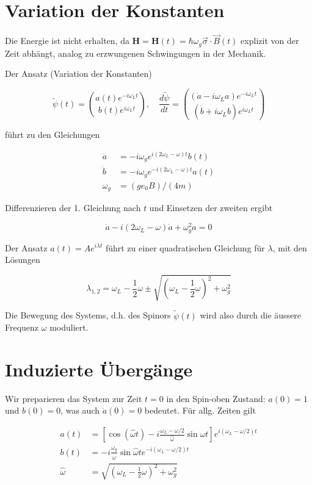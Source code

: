 \documentclass[10pt, letterpaper]{article}
\begin{document}
\section*{Variation der Konstanten}
Die Energie ist nicht erhalten, da $\mathbf{H}=\mathbf{H}(t)=\hbar \omega_{g} \vec{\sigma} \cdot \vec{B}(t)$ explizit von der Zeit abhängt, analog zu erzwungenen Schwingungen in der Mechanik.

Der Ansatz (Variation der Konstanten)

$$
\tilde{\psi}(t)=\binom{a(t) e^{-i \omega_{L} t}}{b(t) e^{i \omega_{L} t}}, \quad \frac{d \tilde{\psi}}{d t}=\binom{\left(\dot{a}-i \omega_{L} a\right) e^{-i \omega_{L} t}}{\left(\dot{b}+i \omega_{L} b\right) e^{i \omega_{L} t}}
$$

führt zu den Gleichungen

$$
\begin{aligned}
\dot{a} & =-i \omega_{g} e^{i\left(2 \omega_{L}-\omega\right) t} b(t) \\
\dot{b} & =-i \omega_{g} e^{-i\left(2 \omega_{L}-\omega\right) t} a(t) \\
\omega_{g} & =\left(g e_{0} B\right) /(4 m)
\end{aligned}
$$

Differenzieren der 1. Gleichung nach $t$ und Einsetzen der zweiten ergibt

$$
\ddot{a}-i\left(2 \omega_{L}-\omega\right) \dot{a}+\omega_{g}^{2} a=0
$$

Der Ansatz $a(t)=A e^{i \lambda t}$ führt zu einer quadratischen Gleichung für $\lambda$, mit den Lösungen

$$
\lambda_{1,2}=\omega_{L}-\frac{1}{2} \omega \pm \sqrt{\left(\omega_{L}-\frac{1}{2} \omega\right)^{2}+\omega_{g}^{2}}
$$

Die Bewegung des Systems, d.h. des Spinors $\tilde{\psi}(t)$ wird also durch die äussere Frequenz $\omega$ moduliert.

\section*{Induzierte Übergänge}
Wir preparieren das System zur Zeit $t=0$ in den Spin-oben Zustand: $a(0)=1$ und $b(0)=0$, was auch $\dot{a}(0)=0$ bedeutet. Für allg. Zeiten gilt

$$
\begin{aligned}
a(t) & =\left[\cos (\widehat{\omega} t)-i \frac{\omega_{L}-\omega / 2}{\widehat{\omega}} \sin \widehat{\omega} t\right] e^{i\left(\omega_{L}-\omega / 2\right) t} \\
b(t) & =-i \frac{\omega_{g}}{\widehat{\omega}} \sin \widehat{\omega} t e^{-i\left(\omega_{L}-\omega / 2\right) t} \\
\widehat{\omega} & =\sqrt{\left(\omega_{L}-\frac{1}{2} \omega\right)^{2}+\omega_{g}^{2}}
\end{aligned}
$$
\end{document}
